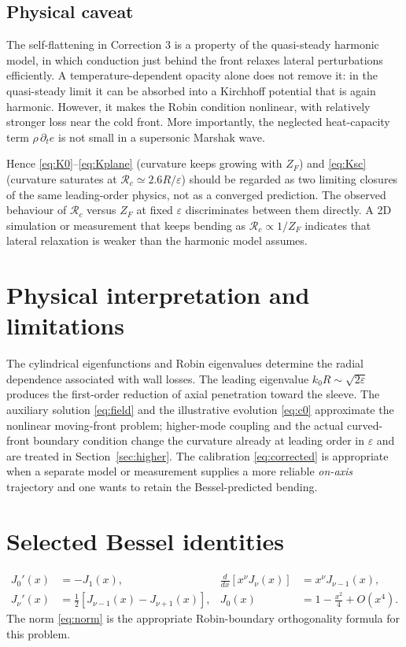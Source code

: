 \documentclass[11pt]{article}
\numberwithin{equation}{section}
\begin{document}
\subsection{Physical caveat}
The self-flattening in Correction 3 is a property of the quasi-steady harmonic model, in which conduction just behind the front relaxes lateral perturbations efficiently. A temperature-dependent opacity alone does not remove it: in the quasi-steady limit it can be absorbed into a Kirchhoff potential that is again harmonic. However, it makes the Robin condition nonlinear, with relatively stronger loss near the cold front. More importantly, the neglected heat-capacity term $\rho\,\partial_te$ is not small in a supersonic Marshak wave.

Hence \eqref{eq:K0}--\eqref{eq:Kplane} (curvature keeps growing with $Z_F$) and \eqref{eq:Ksc} (curvature saturates at $\mathcal R_c\simeq2.6R/\varepsilon$) should be regarded as two limiting closures of the same leading-order physics, not as a converged prediction. The observed behaviour of $\mathcal R_c$ versus $Z_F$ at fixed $\varepsilon$ discriminates between them directly. A 2D simulation or measurement that keeps bending as $\mathcal R_c\propto1/Z_F$ indicates that lateral relaxation is weaker than the harmonic model assumes.

\section{Physical interpretation and limitations}
The cylindrical eigenfunctions and Robin eigenvalues determine the radial dependence associated with wall losses. The leading eigenvalue $k_0R\sim\sqrt{2\varepsilon}$ produces the first-order reduction of axial penetration toward the sleeve. The auxiliary solution \eqref{eq:field} and the illustrative evolution \eqref{eq:c0} approximate the nonlinear moving-front problem; higher-mode coupling and the actual curved-front boundary condition change the curvature already at leading order in $\varepsilon$ and are treated in Section~\ref{sec:higher}. The calibration \eqref{eq:corrected} is appropriate when a separate model or measurement supplies a more reliable \emph{on-axis} trajectory and one wants to retain the Bessel-predicted bending.

\section{Selected Bessel identities}
\begin{align}
J_0'(x)&=-J_1(x), &\frac{d}{dx}[x^\nu J_\nu(x)]&=x^\nu J_{\nu-1}(x),\\
J_\nu'(x)&=\tfrac12[J_{\nu-1}(x)-J_{\nu+1}(x)], &J_0(x)&=1-\frac{x^2}{4}+O(x^4).
\end{align}
The norm \eqref{eq:norm} is the appropriate Robin-boundary orthogonality formula for this problem.
\end{document}
